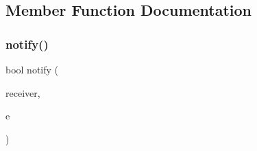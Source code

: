 \subsection{Member Function Documentation}
\mbox{\label{classQSPLApplication_a72d80fdb695d9912886cdf23fdf8c1ce}} 
\subsubsection{\texorpdfstring{notify()}{notify()}}
{\footnotesize\ttfamily bool notify (\begin{DoxyParamCaption}\item[{Q\+Object $\ast$}]{receiver,  }\item[{Q\+Event $\ast$}]{e }\end{DoxyParamCaption})\hspace{0.3cm}{\ttfamily [override]}}

